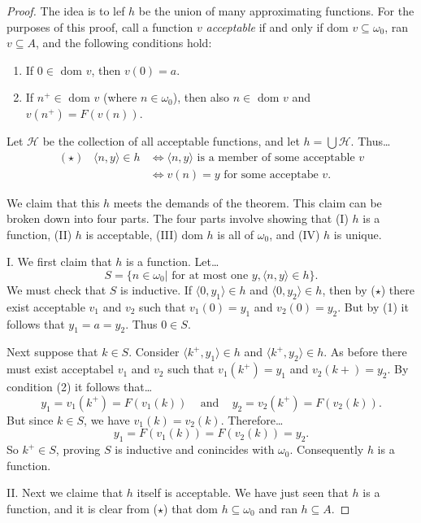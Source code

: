 \begin{proof}
The idea is to lef $h$ be the union of many approximating functions. For the purposes of this proof, call a function $v$ \emph{acceptable}
if and only if dom $v \subseteq \omega_0$, ran $v \subseteq A$, and the following conditions hold:
\begin{enumerate}
  \item If $0 \in$ dom $v$, then $v(0) = a$.
  \item If $n^+ \in$ dom $v$ (where $n \in \omega_0$), then also $n \in$ dom $v$ and $v(n^+) = F(v(n))$.
\end{enumerate}

Let $\mathcal{H}$ be the collection of all acceptable functions, and let $h = \bigcup \mathcal{H}.$ Thus\dots
\begin{align*}
(\star) \; \; \; \langle n, y \rangle \in h &\Leftrightarrow \langle n, y \rangle \textrm{ is a member of some acceptable } v\\
 						   &\Leftrightarrow v(n) = y \textrm{ for some acceptabe } v.
\end{align*}

We claim that this $h$ meets the demands of the theorem. This claim can be broken down into four parts. The four parts involve showing that (I) $h$ is a function,
(II) $h$ is acceptable, (III) dom $h$ is all of $\omega_0$, and (IV) $h$ is unique.\newline


I. We first claim that $h$ is a function. Let\dots
$$S = \{ n \in \omega_0 | \textrm{ for at most one } y, \langle n, y \rangle \in h \}.$$
We must check that $S$ is inductive. If $\langle 0, y_1 \rangle \in h$ and $\langle 0, y_2 \rangle \in h$, then by ($\star$) there exist acceptable $v_1$ and $v_2$
such that $v_1(0) = y_1$ and $v_2(0)=y_2$. But by (1) it follows that $y_1 = a = y_2$. Thus $0 \in S$.

Next suppose that $k \in S$. Consider $\langle k^+, y_1 \rangle \in h$ and $\langle k^+, y_2 \rangle \in h.$ As before there must exist acceptabel $v_1$ and $v_2$ such that
$v_1(k^+) = y_1$ and $v_2(k+) = y_2.$ By condition (2) it follows that\dots
$$y_1 = v_1(k^+) = F(v_1(k)) \; \; \; \textrm{ and } \; \; \; y_2 = v_2(k^+) = F(v_2(k)).$$
But since $k \in S$, we have $v_1(k) = v_2(k).$ Therefore\dots
$$y_1 = F(v_1(k)) = F(v_2(k)) = y_2.$$
So $k^+ \in S$, proving $S$ is inductive and conincides with $\omega_0$. Consequently $h$ is a function.\newline


II. Next we claime that $h$ itself is acceptable. We have just seen that $h$ is a function, and it is clear from ($\star$) that dom $h \subseteq \omega_0$ and ran $h \subseteq A.$


\end{proof}
